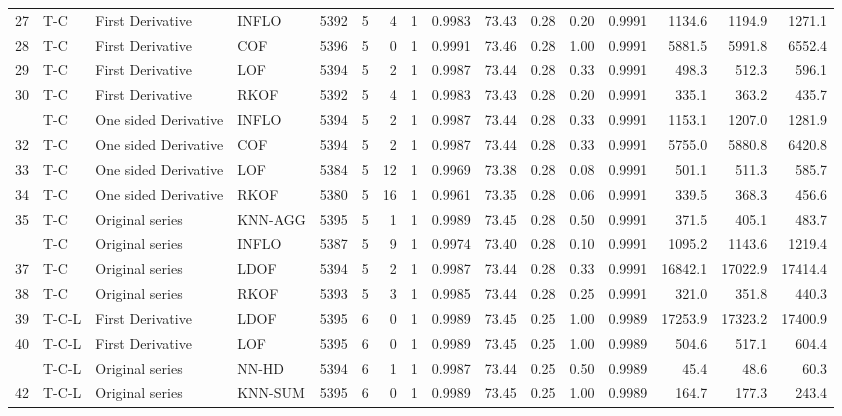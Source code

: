 \documentclass[draft]{agujournal2018} %
\begin{document}
\begin{table}[!htbp]
{\begin{tabular}{rlllrrrrrrrrrrrr}
27 & T-C & First Derivative & INFLO & 5392 & 5 & 4 & 1 & 0.9983 & 73.43 & 0.28 & 0.20 & 0.9991 & 1134.6 & 1194.9 & 1271.1\\
28 & T-C & First Derivative & COF & 5396 & 5 & 0 & 1 & 0.9991 & 73.46 & 0.28 & 1.00 & 0.9991 & 5881.5 & 5991.8 & 6552.4\\
29 & T-C & First Derivative & LOF & 5394 & 5 & 2 & 1 & 0.9987 & 73.44 & 0.28 & 0.33 & 0.9991 & 498.3 & 512.3 & 596.1\\
30 & T-C & First Derivative & RKOF & 5392 & 5 & 4 & 1 & 0.9983 & 73.43 & 0.28 & 0.20 & 0.9991 & 335.1 & 363.2 & 435.7\\
\addlinespace
31 & T-C & One sided Derivative & INFLO & 5394 & 5 & 2 & 1 & 0.9987 & 73.44 & 0.28 & 0.33 & 0.9991 & 1153.1 & 1207.0 & 1281.9\\
32 & T-C & One sided Derivative & COF & 5394 & 5 & 2 & 1 & 0.9987 & 73.44 & 0.28 & 0.33 & 0.9991 & 5755.0 & 5880.8 & 6420.8\\
33 & T-C & One sided Derivative & LOF & 5384 & 5 & 12 & 1 & 0.9969 & 73.38 & 0.28 & 0.08 & 0.9991 & 501.1 & 511.3 & 585.7\\
34 & T-C & One sided Derivative & RKOF & 5380 & 5 & 16 & 1 & 0.9961 & 73.35 & 0.28 & 0.06 & 0.9991 & 339.5 & 368.3 & 456.6\\
35 & T-C & Original series & KNN-AGG & 5395 & 5 & 1 & 1 & 0.9989 & 73.45 & 0.28 & 0.50 & 0.9991 & 371.5 & 405.1 & 483.7\\
\addlinespace
36 & T-C & Original series & INFLO & 5387 & 5 & 9 & 1 & 0.9974 & 73.40 & 0.28 & 0.10 & 0.9991 & 1095.2 & 1143.6 & 1219.4\\
37 & T-C & Original series & LDOF & 5394 & 5 & 2 & 1 & 0.9987 & 73.44 & 0.28 & 0.33 & 0.9991 & 16842.1 & 17022.9 & 17414.4\\
38 & T-C & Original series & RKOF & 5393 & 5 & 3 & 1 & 0.9985 & 73.44 & 0.28 & 0.25 & 0.9991 & 321.0 & 351.8 & 440.3\\
39 & T-C-L & First Derivative & LDOF & 5395 & 6 & 0 & 1 & 0.9989 & 73.45 & 0.25 & 1.00 & 0.9989 & 17253.9 & 17323.2 & 17400.9\\
40 & T-C-L & First Derivative & LOF & 5395 & 6 & 0 & 1 & 0.9989 & 73.45 & 0.25 & 1.00 & 0.9989 & 504.6 & 517.1 & 604.4\\
\addlinespace
41 & T-C-L & Original series &  \color{black} NN-HD \color{black}  & 5394 & 6 & 1 & 1 & 0.9987 & 73.44 & 0.25 & 0.50 & 0.9989 & 45.4 & 48.6 & 60.3\\
42 & T-C-L & Original series & KNN-SUM & 5395 & 6 & 0 & 1 & 0.9989 & 73.45 & 0.25 & 1.00 & 0.9989 & 164.7 & 177.3 & 243.4\\

\end{tabular}}
\end{table}
\end{document}
